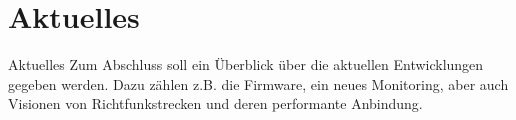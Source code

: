 \section{Aktuelles}

\begin{frame}{Aktuelles}
Zum Abschluss soll ein Überblick über die aktuellen Entwicklungen
gegeben werden. Dazu zählen z.B. die Firmware, ein neues Monitoring,
aber auch Visionen von Richtfunkstrecken und deren performante
Anbindung.
\end{frame}

